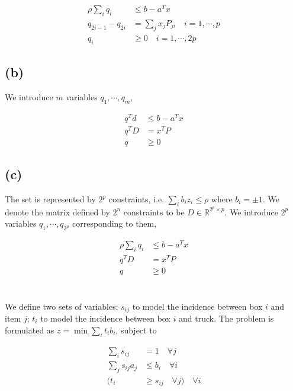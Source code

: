 \documentclass{article}
\newcommand{\1}{\bm 1}
\begin{document}
$$
\begin{aligned}
    \displaystyle
\rho\sum_iq_i&\le b-a^Tx\\
q_{2i-1}-q_{2i}&=\sum_j x_jP_{ji}\quad i=1,\cdots,p\\
q_i&\ge0\quad i=1,\cdots,2p
\end{aligned}
$$

\subsection*{(b)}

We introduce $m$ variables $q_1,\cdots,q_m$,

$$
\begin{aligned}
\displaystyle
q^Td&\le b-a^Tx\\
q^TD&=x^TP\\
q&\ge0
\end{aligned}
$$

\subsection*{(c)}

The set is represented by $2^p$ constraints, i.e. $\sum_i b_iz_i\le\rho$ where $b_i=\pm1$. We denote the matrix defined by $2^n$ constraints to be $D\in\mathbb R^{2^p\times p}$. We introduce $2^p$ variables $q_1,\cdots,q_{2^p}$ corresponding to them,

$$
\begin{aligned}
\displaystyle
\rho\sum_iq_i&\le b-a^Tx\\
q^TD&=x^TP\\
q&\ge0
\end{aligned}
$$

\section{}

We define two sets of variables: $s_{ij}$ to model the incidence between box $i$ and item $j$; $t_i$ to model the incidence between box $i$ and truck. The problem is formulated as $z=\min \sum_it_ib_i$, subject to

$$
\begin{aligned}
\displaystyle
\sum_is_{ij}&=1\quad\forall j\\
\sum_js_{ij}a_j&\le b_i\quad\forall i\\
(t_i&\ge s_{ij}\quad\forall j)\quad\forall i
\end{aligned}
$$
\end{document}
